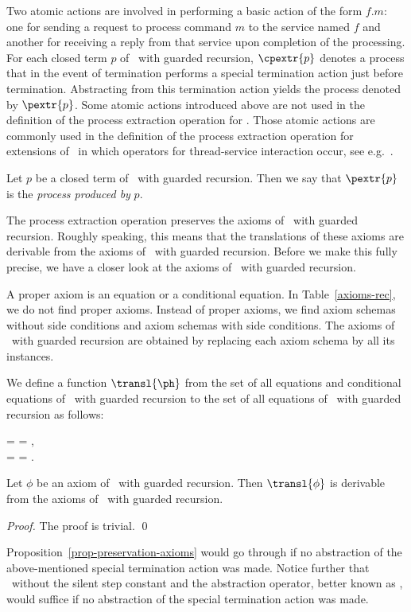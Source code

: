 \documentclass[fleqn]{llncs}
\begin{document}
Two atomic actions are involved in performing a basic action of the form
$f.m$: one for sending a request to process command $m$ to the service
named $f$ and another for receiving a reply from that service upon
completion of the processing.
For each closed term $p$ of \BTA\ with guarded recursion, $\cpextr{p}$
denotes a process that in the event of termination performs a special
termination action just before termination.
Abstracting from this termination action yields the process denoted by
$\pextr{p}$.
Some atomic actions introduced above are not used in the definition of
the process extraction operation for \BTA.
Those atomic actions are commonly used in the definition of the process
extraction operation for extensions of \BTA\ in which operators for
thread-service interaction occur, see e.g.~\cite{BM05c}.

Let $p$ be a closed term of \BTA\ with guarded recursion.
Then we say that $\pextr{p}$ is the \emph{process produced by} $p$.

\sloppy
The process extraction operation preserves the axioms of \BTA\ with
guarded recursion.
Roughly speaking, this means that the translations of these axioms are
derivable from the axioms of \ACPt\ with guarded recursion.
Before we make this fully precise, we have a closer look at the axioms
of \BTA\ with guarded recursion.

A proper axiom is an equation or a conditional equation.
In Table~\ref{axioms-rec}, we do not find proper axioms.
Instead of proper axioms, we find axiom schemas without side conditions
and axiom schemas with side conditions.
The axioms of \BTA\ with guarded recursion are obtained by replacing
each axiom schema by all its instances.

We define a function $\transl{\ph}$ from the set of all equations and
conditional equations of \BTA\ with guarded recursion to the set of all
equations of \ACPt\ with guarded recursion as follows:
\begin{ldispl}
 \;\;=\;\;  = \;,
\\
 \;\;=\;\;
 \Implies
{} = \;.
\end{ldispl}
\begin{proposition}
\label{prop-preservation-axioms}
Let $\phi$ be an axiom of \BTA\ with guarded recursion.
Then $\transl{\phi}$ is derivable from the axioms of \ACPt\ with guarded
recursion.
\end{proposition}
\begin{proof}
The proof is trivial.
\qed
\end{proof}
Proposition~\ref{prop-preservation-axioms} would go through if no
abstraction of the above-mentioned special termination action was made.
Notice further that \ACPt\ without the silent step constant and the
abstraction operator, better known as \ACP, would suffice if no
abstraction of the special termination action was made.
\end{document}
